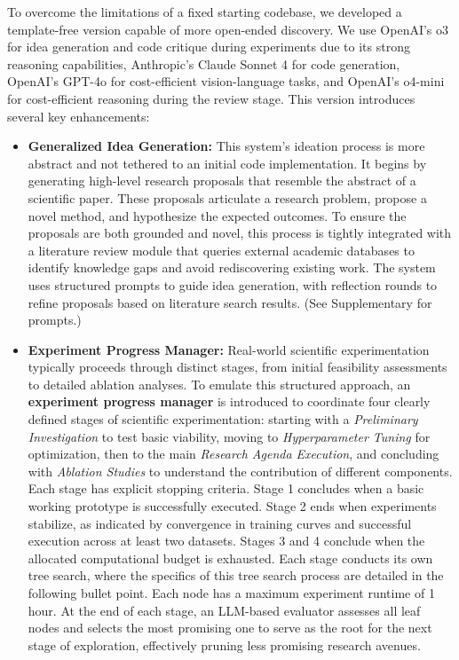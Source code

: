 To overcome the limitations of a fixed starting codebase, we developed a template-free version capable of more open-ended discovery.
We use OpenAI's o3 for idea generation and code critique during experiments due to its strong reasoning capabilities, Anthropic's Claude Sonnet 4 for code generation, OpenAI's GPT-4o for cost-efficient vision-language tasks, and OpenAI's o4-mini for cost-efficient reasoning during the review stage.
This version introduces several key enhancements:
\begin{itemize}
    \item \textbf{Generalized Idea Generation:} This system's ideation process is more abstract and not tethered to an initial code implementation. It begins by generating high-level research proposals that resemble the abstract of a scientific paper. These proposals articulate a research problem, propose a novel method, and hypothesize the expected outcomes. To ensure the proposals are both grounded and novel, this process is tightly integrated with a literature review module that queries external academic databases to identify knowledge gaps and avoid rediscovering existing work. The system uses structured prompts to guide idea generation, with reflection rounds to refine proposals based on literature search results.
    (See Supplementary  for prompts.)

    \item 
    \textbf{Experiment Progress Manager:} 
    Real-world scientific experimentation typically proceeds through distinct stages, from initial feasibility assessments to detailed ablation analyses. To emulate this structured approach, an \textbf{experiment progress manager} is introduced to coordinate four clearly defined stages of scientific experimentation:
    starting with a \textit{Preliminary Investigation} to test basic viability, moving to \textit{Hyperparameter Tuning} for optimization, then to the main \textit{Research Agenda Execution}, and concluding with \textit{Ablation Studies} to understand the contribution of different components. 
    Each stage has explicit stopping criteria. Stage 1 concludes when a basic working prototype is successfully executed. Stage 2 ends when experiments stabilize, as indicated by convergence in training curves and successful execution across at least two datasets. Stages 3 and 4 conclude when the allocated computational budget is exhausted.
    Each stage conducts its own tree search, where the specifics of this tree search process are detailed in the following bullet point.
    Each node has a maximum experiment runtime of 1 hour. At the end of each stage, an LLM-based evaluator assesses all leaf nodes and selects the most promising one to serve as the root for the next stage of exploration, effectively pruning less promising research avenues. 


\end{itemize}
